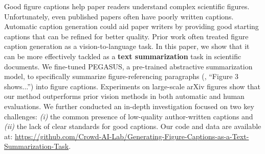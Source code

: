 Good figure captions help paper readers understand complex scientific figures.
Unfortunately, even published papers often have poorly written captions.
Automatic caption generation could aid paper writers by providing good starting captions that can be refined for better quality.
Prior work often treated figure caption generation as a vision-to-language task.
In this paper, we show that it can be more effectively tackled as a \textbf{text summarization} task in scientific documents.
We fine-tuned PEGASUS, a pre-trained abstractive summarization model, to specifically summarize figure-referencing paragraphs (\eg, ``Figure 3 shows...'') into figure captions.
Experiments on large-scale arXiv figures show that our method outperforms prior vision methods in both automatic and human evaluations.
We further conducted an in-depth investigation focused on two key challenges: {\em (i)} the common presence of low-quality author-written captions and {\em (ii)} the lack of clear standards for good captions.
Our code and data are available at: \url{https://github.com/Crowd-AI-Lab/Generating-Figure-Captions-as-a-Text-Summarization-Task}.




